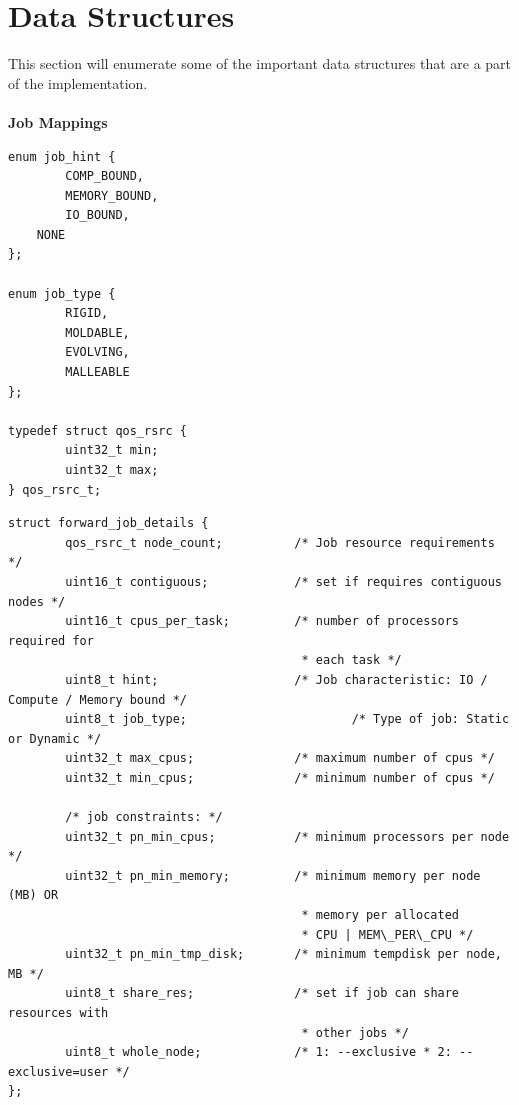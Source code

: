 \section{Data Structures}
This section will enumerate some of the important data structures that are a part of the implementation.\\ \\
\textbf{Job Mappings}
\begin{lstlisting}[mathescape]
enum job_hint {
        COMP_BOUND,
        MEMORY_BOUND,
        IO_BOUND,
	NONE
};

enum job_type {
        RIGID,
        MOLDABLE,
        EVOLVING,
        MALLEABLE
};

typedef struct qos_rsrc {   
        uint32_t min;
        uint32_t max;
} qos_rsrc_t;
\end{lstlisting}
\begin{lstlisting}[mathescape]
struct forward_job_details {
        qos_rsrc_t node_count;          /* Job resource requirements */
        uint16_t contiguous;            /* set if requires contiguous nodes */
        uint16_t cpus_per_task;         /* number of processors required for
                                         * each task */
        uint8_t hint;                   /* Job characteristic: IO / Compute / Memory bound */
        uint8_t job_type;                       /* Type of job: Static or Dynamic */
        uint32_t max_cpus;              /* maximum number of cpus */
        uint32_t min_cpus;              /* minimum number of cpus */

        /* job constraints: */
        uint32_t pn_min_cpus;           /* minimum processors per node */
        uint32_t pn_min_memory;         /* minimum memory per node (MB) OR
                                         * memory per allocated
                                         * CPU | MEM\_PER\_CPU */
        uint32_t pn_min_tmp_disk;       /* minimum tempdisk per node, MB */
        uint8_t share_res;              /* set if job can share resources with
                                         * other jobs */
        uint8_t whole_node;             /* 1: --exclusive * 2: --exclusive=user */
};
\end{lstlisting}
